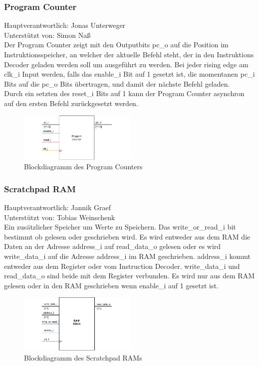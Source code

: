 \documentclass[bibliography=totoc,listof=totoc,index=totoc]{scrartcl}
\begin{document}
\subsubsection{Program Counter}
\begin{multicols}{2}
Hauptverantwortlich: Jonas Unterweger\\
Unterstützt von: Simon Naß\\
Der Program Counter zeigt mit den Outputbits pc\_o auf die Position im Instruktionsspeicher, an welcher der aktuelle Befehl steht, der in den Instruktions Decoder geladen werden soll um ausgeführt zu werden. Bei jeder rising edge am clk\_i Input werden, falls das enable\_i Bit auf 1 gesetzt ist, die momentanen pc\_i Bits auf die pc\_o Bits übertragen, und damit der nächste Befehl geladen. \\
Durch ein setzten des reset\_i Bits auf 1 kann der Program Counter asynchron auf den ersten Befehl zurückgesetzt werden.
\begin{figure}[H]
    \centering
    \includegraphics[width=0.5\textwidth]{ProgramCounter_beschreibung.pdf}
    \caption{Blockdiagramm des Program Counters}
    \label{fig:Block_ProgramCounter}
\end{figure}
\end{multicols}

\subsubsection{Scratchpad RAM}
\begin{multicols}{2}
Hauptverantwortlich: Jannik Graef\\
Unterstützt von: Tobias Weinschenk\\
Ein zusätzlicher Speicher um Werte zu Speichern. Das write\_or\_read\_i bit bestimmt ob gelesen oder geschrieben wird. Es wird entweder aus dem RAM die Daten an der Adresse address\_i auf read\_data\_o gelesen  oder es wird write\_data\_i auf die Adresse address\_i im RAM geschrieben. address\_i kommt entweder aus dem Register oder vom Instruction Decoder. write\_data\_i und read\_data\_o sind beide mit dem Register verbunden. Es wird nur aus dem RAM gelesen oder in den RAM geschrieben wenn enable\_i auf 1 gesetzt ist.
\begin{figure}[H]
    \centering
    \includegraphics[width=0.5\textwidth]{RAM_beschreibung.pdf}
    \caption{Blockdiagramm des Scratchpad RAMs}
    \label{fig:Block_ScratchpadRAM}
\end{figure}
\end{multicols}
\end{document}
